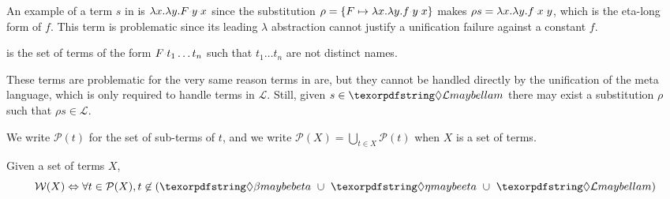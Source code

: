 \documentclass[sigconf,natbib=false,review]{acmart}
\newcommand{\appsep}{\ensuremath{\textcolor{lightgray}{\cdot}}}
\newcommand{\llambda}{\ensuremath{\mathcal{L}}\xspace}
\newcommand{\Ho}{\texorpdfstring{\ensuremath{\mathcal{M}}\xspace}{M}}
\begin{document}
\noindent
An example of a term $s$ in \maybeeta{} is
$\lambda x.\lambda y.F \appsep y \appsep x$
since the substitution
$\rho = \{ F \mapsto \lambda x.\lambda y.f \appsep y \appsep x\}$
makes $\rho s = \lambda x.\lambda y.f \appsep x \appsep y$,
which is the eta-long form of $f$. This term is problematic since
its leading $\lambda$ abstraction cannot justify a
unification failure against a constant $f$.

\begin{definition}[\notllambda]\label{def:notllambda}
  \notllambda is the set of terms of the form $F \appsep t_1 \ldots t_n$
  such that $t_1 \ldots t_n$ are not distinct names.
\end{definition}

\noindent
These terms are problematic for the very same reason terms in \maybebeta are,
but they cannot be handled directly by the unification of the meta language, which
is only required to handle terms in \llambda. Still, given $s \in \notllambda$
there may exist a substitution $\rho$ such that $\rho s \in \llambda$.


\newcommand{\subterm}[1]{\ensuremath{\mathcal{P}(#1)}}
We write $\subterm{t}$ for the set of sub-terms of $t$, and
we write $\subterm{X} = \bigcup_{t\in X} \subterm{t}$ when $X$ is a set of terms.

\newcommand{\wellb}{\ensuremath{\mathcal{W}}\xspace}
\begin{definition}
Given a set of terms $X$, %
$$
\wellb(X) \Leftrightarrow \forall t \in \subterm{X},
t \not\in (\maybebeta{} ~\cup~ \maybeeta{} ~\cup~ \notllambda{})
$$
\end{definition}
\end{document}
